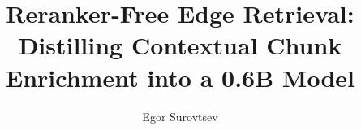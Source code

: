 \documentclass[11pt]{article}
\title{\bfseries Reranker-Free Edge Retrieval:\\
Distilling Contextual Chunk Enrichment into a 0.6B Model}
\author{Egor Surovtsev}
\date{}
\begin{document}
\maketitle

\begin{abstract}

\end{abstract}












\end{document}
